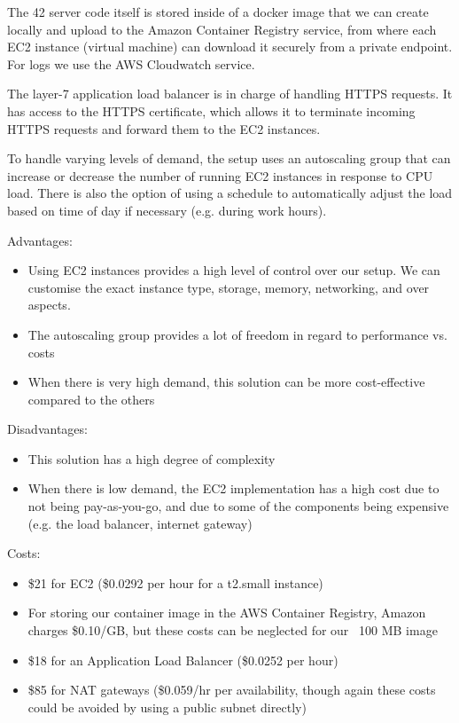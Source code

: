 The 42 server code itself is stored inside of a docker image that we can create locally and upload to the Amazon Container Registry service, from where each EC2 instance (virtual machine) can download it securely from a private endpoint. For logs we use the AWS Cloudwatch service.

The layer-7 application load balancer is in charge of handling HTTPS requests. It has access to the HTTPS certificate, which allows it to terminate incoming HTTPS requests and forward them to the EC2 instances.

To handle varying levels of demand, the setup uses an autoscaling group that can increase or decrease the number of running EC2 instances in response to CPU load. There is also the option of using a schedule to automatically adjust the load based on time of day if necessary (e.g. during work hours).

Advantages:
\begin{itemize}
\item Using EC2 instances provides a high level of control over our setup. We can customise the exact instance type, storage, memory, networking, and over aspects.
\item The autoscaling group provides a lot of freedom in regard to performance vs. costs
\item When there is very high demand, this solution can be more cost-effective compared to the others
\end{itemize}

Disadvantages:
\begin{itemize}
\item This solution has a high degree of complexity
\item When there is low demand, the EC2 implementation has a high cost due to not being pay-as-you-go, and due to some of the components being expensive (e.g. the load balancer, internet gateway)
\end{itemize}

Costs:
\begin{itemize}
\item \$21 for EC2 (\$0.0292 per hour for a t2.small instance)
\item For storing our container image in the AWS Container Registry, Amazon charges \$0.10/GB, but these costs can be neglected for our ~100 MB image
\item \$18 for an Application Load Balancer (\$0.0252 per hour)
\item \$85 for NAT gateways (\$0.059/hr per availability, though again these costs could be avoided by using a public subnet directly)
\end{itemize}

